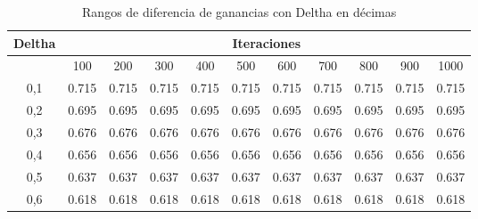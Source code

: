 \begin{table}[h]
\small
\caption{Rangos de diferencia de ganancias con Deltha en décimas}
\begin{tabular}{crrrrrrrrrr}
\hline
\multicolumn{1}{l}{Deltha} & \multicolumn{10}{c}{Iteraciones} \\ \hline
\multicolumn{1}{l}{}       & \multicolumn{1}{c}{100} & \multicolumn{1}{c}{200} & \multicolumn{1}{c}{300} & \multicolumn{1}{c}{400} & \multicolumn{1}{c}{500} & \multicolumn{1}{c}{600} & \multicolumn{1}{c}{700} & \multicolumn{1}{c}{800} & \multicolumn{1}{c}{900} & \multicolumn{1}{c}{1000} \\ \hline
0,1                          & 0.715                    & 0.715                    & 0.715                    & 0.715                    & 0.715                    & 0.715                    & 0.715                    & 0.715                    & 0.715                    & 0.715                     \\ 
0,2                          & 0.695                    & 0.695                    & 0.695                    & 0.695                    & 0.695                    & 0.695                    & 0.695                    & 0.695                    & 0.695                    & 0.695                     \\ 
0,3                          & 0.676                    & 0.676                    & 0.676                    & 0.676                    & 0.676                    & 0.676                    & 0.676                    & 0.676                    & 0.676                    & 0.676                     \\ 
0,4                          & 0.656                    & 0.656                    & 0.656                    & 0.656                    & 0.656                    & 0.656                    & 0.656                    & 0.656                    & 0.656                    & 0.656                     \\ 
0,5                          & 0.637                    & 0.637                    & 0.637                    & 0.637                    & 0.637                    & 0.637                    & 0.637                    & 0.637                    & 0.637                    & 0.637                     \\ 
0,6                          & 0.618                    & 0.618                    & 0.618                    & 0.618                    & 0.618                    & 0.618                    & 0.618                    & 0.618                    & 0.618                    & 0.618                     \\ 

\end{tabular}
\end{table}
